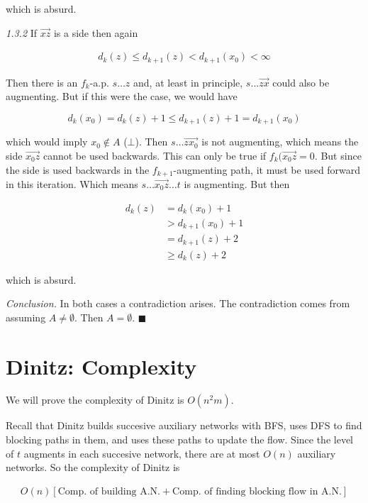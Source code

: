 which is absurd.

\textit{1.3.2} If  $\overrightarrow{xz}$ is a side then again

\begin{align*}
    d_k(z) \leq d_{k+1}(z) < d_{k+1}(x_0) < \infty
\end{align*}

Then there is an $f_k$-a.p. $s \ldots z$ and, at least in principle, 
$s \ldots \overrightarrow{zx}$ could also be augmenting. But if this were the case,
we would have 

$$
d_k(x_0) = d_k(z) + 1 \leq d_{k+1}(z) + 1 = d_{k+1}(x_0) 
$$

which would imply $x_0 \not\in A$ ($\bot$). Then $s \ldots \overrightarrow{zx_0}$ is 
not augmenting, which means the side $\overrightarrow{x_0z}$ cannot 
be used backwards. This can only be true if $f_k(\overrightarrow{x_0z} = 0$.
But since the side is used backwards in the $f_{k+1}$-augmenting path,
it must be used forward in this iteration. Which means $s \ldots \overrightarrow{x_0z} \ldots t$
is augmenting. But then 

\begin{align*}
    d_{k}(z) &= d_{k}(x_0) + 1 \\ 
             &> d_{k+1}(x_0) + 1 \\ 
             &= d_{k+1}(z) +2 \\ 
             &\geq d_{k}(z) + 2 
\end{align*}

which is absurd.

\textit{Conclusion.} In both cases a contradiction arises. The contradiction
comes from assuming $A \neq \emptyset$. Then $A = \emptyset$. $\blacksquare$


\pagebreak

\section{Dinitz: Complexity}


We will prove the complexity of Dinitz is $O(n^2m)$. 

Recall that Dinitz builds succesive auxiliary networks with BFS, uses DFS to find blocking 
paths in them, and uses these paths to update the flow. Since the level 
of $t$ augments in each succesive network, there are at most $O(n)$ auxiliary 
networks. So the complexity of Dinitz is 

\begin{align*}
    O(n) \left[ \text{Comp. of building A.N.} + \text{Comp. of finding blocking flow in A.N.} \right] 
\end{align*}

